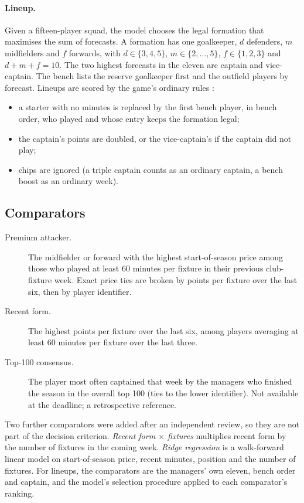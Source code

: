 \documentclass[11pt,a4paper]{article}
\begin{document}
\paragraph{Lineup.} Given a fifteen-player squad, the model chooses the legal formation that
maximises the sum of forecasts. A formation has one goalkeeper, $d$ defenders, $m$ midfielders and
$f$ forwards, with $d\in\{3,4,5\}$, $m\in\{2,\dots,5\}$, $f\in\{1,2,3\}$ and $d+m+f=10$. The two
highest forecasts in the eleven are captain and vice-captain. The bench lists the reserve
goalkeeper first and the outfield players by forecast. Lineups are scored by the game's ordinary
rules \citep{fplrules}:
\begin{itemize}
  \item a starter with no minutes is replaced by the first bench player, in bench order, who played
        and whose entry keeps the formation legal;
  \item the captain's points are doubled, or the vice-captain's if the captain did not play;
  \item chips are ignored (a triple captain counts as an ordinary captain, a bench boost as an
        ordinary week).
\end{itemize}

\subsection{Comparators}
\begin{description}
  \item[Premium attacker.] The midfielder or forward with the highest start-of-season price among
        those who played at least 60 minutes per fixture in their previous club-fixture week. Exact
        price ties are broken by points per fixture over the last six, then by player identifier.
  \item[Recent form.] The highest points per fixture over the last six, among players averaging at
        least 60 minutes per fixture over the last three.
  \item[Top-100 consensus.] The player most often captained that week by the managers who finished
        the season in the overall top 100 (ties to the lower identifier). Not available at the
        deadline; a retrospective reference.
\end{description}
Two further comparators were added after an independent review, so they are not part of the
decision criterion.
\emph{Recent form $\times$ fixtures} multiplies recent form by the number of fixtures in the coming
week. \emph{Ridge regression} is a walk-forward linear model on start-of-season price, recent
minutes, position and the number of fixtures. For lineups, the comparators are the managers' own
eleven, bench order and captain, and the model's selection procedure applied to each comparator's
ranking.
\end{document}
